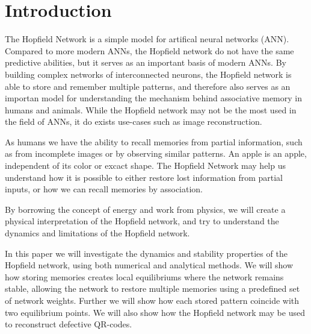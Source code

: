 \section{Introduction}
The Hopfield Network is a simple model for artifical neural networks (ANN). Compared to more modern ANNs, the Hopfield network do not have the same predictive abilities, but it serves as an important basis of modern ANNs. By building complex networks of interconnected neurons, the Hopfield network is able to store and remember multiple patterns, and therefore also serves as an importan model for understanding the mechanism behind associative memory in humans and animals. While the Hopfield network may not be the most used in the field of ANNs, it do exists use-cases such as image reconstruction. 

As humans we have the ability to recall memories from partial information, such as from incomplete images or by observing similar patterns. An apple is an apple, independent of its color or excact shape. The Hopfield Network may help us understand how it is possible to either restore lost information from partial inputs, or how we can recall memories by association.

By borrowing the concept of energy and work from physics, we will create a physical interpretation of the Hopfield network, and try to understand the dynamics and limitations of the Hopfield network.


In this paper we will investigate the dynamics and stability properties of the Hopfield network, using both numerical and analytical methods. We will show how storing memories creates local equilibriums where the network remains stable, allowing the network to restore multiple memories using a predefined set of network weights. Further we will show how each stored pattern coincide with two equilibrium points. We will also show how the Hopfield network may be used to reconstruct defective QR-codes.